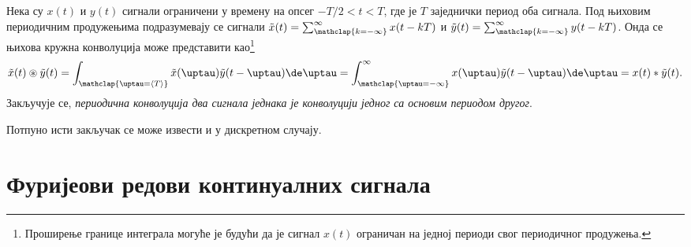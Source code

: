 Нека су $x(t)$ и $y(t)$ сигнали ограничени у времену на опсег $-T/2 < t < T$, где је $T$ заједнички период оба сигнала. 
Под њиховим периодичним продужењима подразумевају се сигнали
$\tilde{x}(t) = \sum_{\mathclap{k = -\infty}}^{\infty} x(t - kT)$ и 
$\tilde y(t) =  \sum_{\mathclap{k = -\infty}}^{\infty} y(t - kT)$. Онда се њихова кружна конволуција може представити 
као\footnote{Проширење границе интеграла могуће је будући да је сигнал $x(t)$ ограничан на једној периоди свог 
периодичног продужења.}
\begin{equation}
    \tilde x(t) \circledast \tilde y(t) = \int_{\mathclap{\uptau = \langle T \rangle }} \tilde x(\uptau) \tilde y(t-\uptau) \de \uptau
    = \int_{\mathclap{\uptau =-\infty}}^{\infty} x(\uptau) \tilde y(t-\uptau) \de \uptau = x(t) \ast \tilde y(t). 
\end{equation}
Закључује се, \textit{периодична конволуција два сигнала једнака је конволуцији једног са основим периодом другог}.
\hfill \Svojstvo

Потпуно исти закључак се може извести и у дискретном случају. 

\section*{Фуријеови редови континуалних сигнала} \label{d:CTFS}

